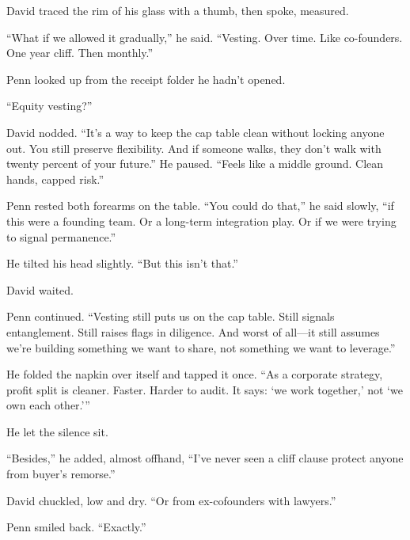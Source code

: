 \medskip

David traced the rim of his glass with a thumb, then spoke, measured.

``What if we allowed it gradually,'' he said. ``Vesting. Over time. Like co-founders. One year cliff. Then monthly.''

Penn looked up from the receipt folder he hadn’t opened.

``Equity vesting?''

David nodded. ``It’s a way to keep the cap table clean without locking anyone out. You still preserve flexibility. And if someone walks, they don’t walk with twenty percent of your future.'' He paused. ``Feels like a middle ground. Clean hands, capped risk.''

Penn rested both forearms on the table. ``You could do that,'' he said slowly, ``if this were a founding team. Or a long-term integration play. Or if we were trying to signal permanence.''

He tilted his head slightly. ``But this isn’t that.''

David waited.

Penn continued. ``Vesting still puts us on the cap table. Still signals entanglement. Still raises flags in diligence. And worst of all—it still assumes we’re building something we want to share, not something we want to leverage.''

He folded the napkin over itself and tapped it once. ``As a corporate strategy, profit split is cleaner. Faster. Harder to audit. It says: ‘we work together,’ not ‘we own each other.’''

He let the silence sit.

``Besides,'' he added, almost offhand, ``I’ve never seen a cliff clause protect anyone from buyer’s remorse.''

David chuckled, low and dry. ``Or from ex-cofounders with lawyers.''

Penn smiled back. ``Exactly.''

\medskip

